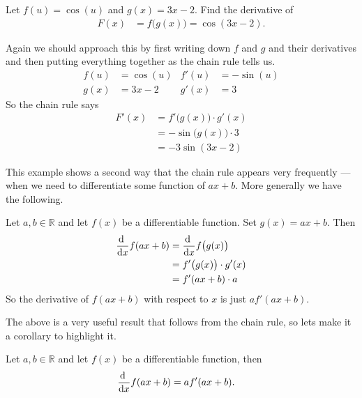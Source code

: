 \begin{eg}
  Let $f(u) = \cos(u)$ and $g(x) = 3x-2$. Find the derivative of
\begin{align*}
  F(x) &= f\big(g(x)\big) = \cos(3x-2).
\end{align*}

Again we should approach this by first writing down $f$ and $g$ and their
derivatives and then putting everything together as the chain rule tells us.
\begin{align*}
  f(u) &= \cos(u) & f'(u) &= -\sin(u) \\
  g(x) &= 3x-2 & g'(x) &= 3
\end{align*}
So the chain rule says
\begin{align*}
  F'(x) &= f'\big(g(x)\big) \cdot g'(x) \\
  &= -\sin\big( g(x) \big) \cdot 3 \\
  &= -3 \sin(3x-2)
\end{align*}
\end{eg}
\goodbreak

This example shows a second way that the chain rule appears
very frequently --- when we need to differentiate some function
of $ax+b$. More generally we have the following.
\begin{eg}
\label{eg:DIFFchainaxb}
  Let $a,b \in \mathbb{R}$ and let $f(x)$ be a differentiable function.
Set  $g(x) = ax+b$. Then
  \begin{align*}
  \diff{}{x} f(ax+b) &= \diff{}{x} f\big(g(x)\big) \\
  &= f'\big(g(x)\big) \cdot g'(x) \\
  &= f'(ax+b) \cdot a
\end{align*}
So the derivative of $f(ax+b)$ with respect to $x$ is just $a f'(ax+b)$.
\end{eg}
The above is a very useful result that follows from the chain rule, so lets make it a
corollary to highlight it.
\begin{cor}\label{cor f of axb}
  Let $a,b \in \mathbb{R}$ and let $f(x)$ be a differentiable function, then
\begin{align*}
  \diff{}{x} f(ax+b) &= af'(ax+b).
\end{align*}
\end{cor}



